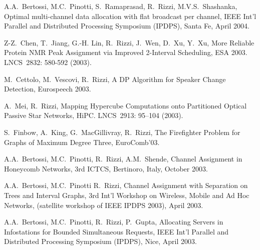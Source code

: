 \begin{etaremune}
\vspace{-1.8mm}
  \item {A.A.~Bertossi, M.C.~Pinotti, S.~Ramaprasad, R.~Rizzi, M.V.S.~Shashanka},
   \newblock Optimal multi-channel data allocation with flat broadcast per channel,
   \newblock IEEE Int’l Parallel and Distributed Processing Symposium (IPDPS),
   \newblock Santa Fe, April 2004.

\vspace{-1.8mm}
  \item {Z-Z.~Chen, T.~Jiang, G.-H. Lin, R.~Rizzi, J.~Wen, D.~Xu, Y.~Xu},
   \newblock More Reliable Protein NMR Peak Assignment via Improved 2-Interval Scheduling,
   \newblock ESA 2003.
   \newblock LNCS~2832: 580-592 (2003).

\vspace{-1.8mm}
  \item {M.~Cettolo, M.~Vescovi, R.~Rizzi},
   \newblock  A DP Algorithm  for Speaker Change Detection,
   \newblock Eurospeech 2003.

\vspace{-1.8mm}
  \item {A.~Mei, R.~Rizzi},
   \newblock Mapping Hypercube Computations onto Partitioned Optical Passive Star Networks,
   \newblock HiPC.
   \newblock  LNCS~2913: 95--104 (2003).

\vspace{-1.8mm}
  \item {S.~Finbow, A.~King, G.~MacGillivray, R.~Rizzi},
   \newblock The Firefighter Problem for Graphs of Maximum Degree Three,
   \newblock EuroComb'03.

\vspace{-1.8mm}
  \item {A.A.~Bertossi, M.C.~Pinotti, R.~Rizzi, A.M.~Shende},
   \newblock Channel Assignment in Honeycomb Networks,
   \newblock 3rd ICTCS,
   \newblock Bertinoro, Italy, October 2003.

\vspace{-1.8mm}
  \item {A.A.~Bertossi, M.C.~Pinotti R.~Rizzi},
   \newblock Channel Assignment with Separation on Trees and Interval Graphs,
   \newblock 3rd Int’l Workshop on Wireless, Mobile and Ad Hoc Networks,
   \newblock (satellite workshop of IEEE IPDPS 2003),
   \newblock April 2003.

\vspace{-1.8mm}
  \item {A.A.~Bertossi, M.C.~Pinotti, R.~Rizzi, P.~Gupta},
   \newblock Allocating Servers in Infostations for Bounded Simultaneous Requests,
   \newblock IEEE Int’l Parallel and Distributed Processing Symposium (IPDPS),
   \newblock Nice, April 2003.


\end{etaremune}
